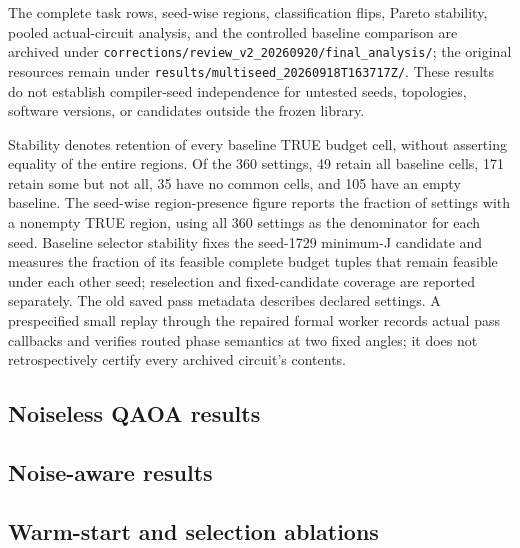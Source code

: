 \documentclass[a4paper,onecolumn,11pt,unpublished]{quantumarticle}
\newcommand{\blankcontent}{\noindent\mbox{}\par}
\theoremstyle{remark}
\begin{document}
The complete task rows, seed-wise regions, classification flips, Pareto
stability, pooled actual-circuit analysis, and the controlled baseline
comparison are archived under
\texttt{corrections/review\_v2\_20260920/final\_analysis/}; the original resources remain under \texttt{results/multiseed\_20260918T163717Z/}.  These results do not establish
compiler-seed independence for untested seeds, topologies, software versions,
or candidates outside the frozen library.


Stability denotes retention of every baseline TRUE budget cell, without
asserting equality of the entire regions.  Of the 360 settings, 49 retain
all baseline cells, 171 retain some but not all, 35 have no common cells,
and 105 have an empty baseline.  The seed-wise region-presence figure reports
the fraction of settings with a nonempty TRUE region, using all 360 settings
as the denominator for each seed.  Baseline selector stability fixes the
seed-1729 minimum-J candidate and measures the fraction of its feasible
complete budget tuples that remain feasible under each other seed;
reselection and fixed-candidate coverage are reported separately.
The old saved pass metadata describes declared settings.  A prespecified
small replay through the repaired formal worker records actual pass callbacks
and verifies routed phase semantics at two fixed angles; it does not retrospectively
certify every archived circuit's contents.

\subsection{Noiseless QAOA results}
\blankcontent

\subsection{Noise-aware results}
\blankcontent

\subsection{Warm-start and selection ablations}
\blankcontent
\end{document}

